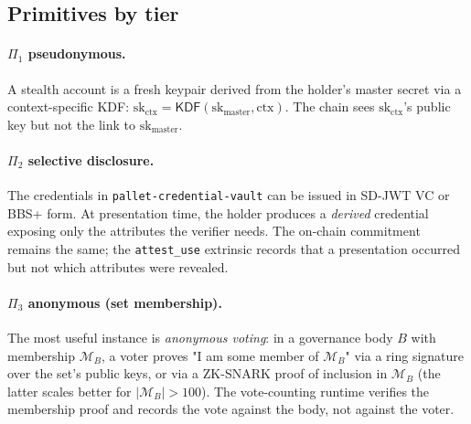 \documentclass[11pt,a4paper,parskip=half-,DIV=12,headings=standardclasses]{scrartcl}
\theoremstyle{ncthm}
\theoremstyle{ncdef}
\newcommand{\KDF}{\mathsf{KDF}}
\begin{document}
\subsection{Primitives by tier}

\paragraph{$\Pi_1$ pseudonymous.}
A stealth account is a fresh keypair derived from the holder's master
secret via a context-specific KDF: $\mathrm{sk}_{\mathrm{ctx}} =
\KDF(\mathrm{sk}_{\mathrm{master}}, \mathrm{ctx})$. The chain sees
$\mathrm{sk}_{\mathrm{ctx}}$'s public key but not the link to
$\mathrm{sk}_{\mathrm{master}}$.

\paragraph{$\Pi_2$ selective disclosure.}
The credentials in \texttt{pallet-credential-vault} can be issued in
SD-JWT VC or BBS+ form. At presentation time, the holder produces a
\emph{derived} credential exposing only the attributes the verifier
needs. The on-chain commitment remains the same; the
\texttt{attest\_use} extrinsic records that a presentation occurred
but not which attributes were revealed.

\paragraph{$\Pi_3$ anonymous (set membership).}
The most useful instance is \emph{anonymous voting}: in a governance
body $B$ with membership $\mathcal{M}_B$, a voter proves "I am some
member of $\mathcal{M}_B$" via a ring signature over the set's public
keys, or via a ZK-SNARK proof of inclusion in $\mathcal{M}_B$ (the
latter scales better for $|\mathcal{M}_B| > 100$). The vote-counting
runtime verifies the membership proof and records the vote against
the body, not against the voter.
\end{document}
